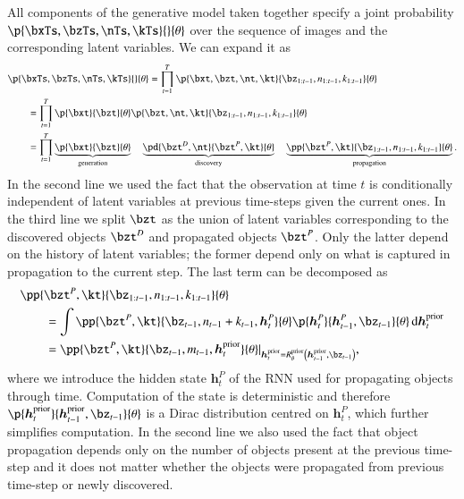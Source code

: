All components of the generative model taken together specify a joint probability $\p{\bxTs, \bzTs,\nTs,\kTs}{}{\theta}$ over the sequence of images and the corresponding latent variables. We can expand it as
\begin{equation}
\begin{aligned}
    &\p{\bxTs, \bzTs,\nTs,\kTs}{}{\theta} = \prod_{t=1}^T \p{\bxt, \bzt, \nt, \kt}{\bz_{1:t-1}, n_{1:t-1}, k_{1:t-1}}{\theta}\\
%    
    &\qquad= \prod_{t=1}^T \p{\bxt}{\bzt}{\theta} \p{\bzt, \nt, \kt}{\bz_{1:t-1}, n_{1:t-1}, k_{1:t-1}}{\theta}\\
%    
    &\qquad= \prod_{t=1}^T \underbrace{\p{\bxt}{\bzt}{\theta}}_\mathrm{generation} \quad \underbrace{\pd{\bzt^D, \nt}{\bzt^P, \kt}{\theta}}_\mathrm{discovery} \quad \underbrace{\pp{\bzt^P, \kt}{\bz_{1:t-1}, n_{1:t-1}, k_{1:t-1}}{\theta}}_\mathrm{propagation}.
\end{aligned}
\end{equation}
In the second line we used the fact that the observation at time $t$ is conditionally independent of latent variables at previous time-steps given the current ones. In the third line we split $\bzt$ as the union of latent variables corresponding to the discovered objects $\bzt^D$ and propagated objects $\bzt^P$. Only the latter depend on the history of latent variables; the former depend only on what is captured in propagation to the current step. The last term can be decomposed as
\begin{equation}
\begin{aligned}
&\pp{\bzt^P, \kt}{\bz_{1:t-1}, n_{1:t-1}, k_{1:t-1}}{\theta}\\
%
&\qquad= \int \pp{\bzt^P, \kt}{\bz_{t-1}, n_{t-1} + k_{t-1}, \bm{h}_t^P}{\theta} \p{\bm{h}_t^P}{\bm{h}_{t-1}^P, \bz_{t-1}}{\theta} \dint \bm{h}_t^\mathrm{prior}\\
%
&\qquad= \pp{\bzt^P, \kt}{\bz_{t-1}, m_{t-1}, \bm{h}_t^\mathrm{prior}}{\theta} \lvert_{\bm{h}_t^\mathrm{prior} = R^\mathrm{prior}_\theta \left( \bm{h}_{t-1}^\mathrm{prior}, \bz_{t-1} \right)},
\end{aligned}
\end{equation}
where we introduce the hidden state $\bm{h}_t^P$ of the RNN used for propagating objects through time. Computation of the state is deterministic and therefore $\p{\bm{h}_t^\mathrm{prior}}{\bm{h}_{t-1}^\mathrm{prior}, \bz_{t-1}}{\theta}$ is a Dirac distribution centred on $\bm{h}_t^P$, which further simplifies computation. In the second line we also used the fact that object propagation depends only on the number of objects present at the previous time-step and it does not matter whether the objects were propagated from previous time-step or newly discovered.


